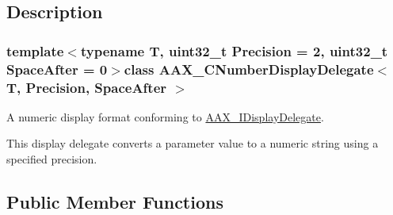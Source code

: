 \subsection{Description}
\subsubsection*{template$<$typename T, uint32\+\_\+t Precision = 2, uint32\+\_\+t Space\+After = 0$>$class A\+A\+X\+\_\+\+C\+Number\+Display\+Delegate$<$ T, Precision, Space\+After $>$}

A numeric display format conforming to \hyperlink{a00092}{A\+A\+X\+\_\+\+I\+Display\+Delegate}. 

This display delegate converts a parameter value to a numeric string using a specified precision. \subsection*{Public Member Functions}
